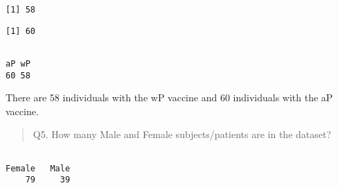 \documentclass[
  letterpaper,
  DIV=11,
  numbers=noendperiod]{scrartcl}
\newenvironment{Shaded}{\begin{snugshade}}{\end{snugshade}}
\newcommand{\FunctionTok}[1]{\textcolor[rgb]{0.28,0.35,0.67}{#1}}
\newcommand{\NormalTok}[1]{\textcolor[rgb]{0.00,0.23,0.31}{#1}}
\newcommand{\SpecialCharTok}[1]{\textcolor[rgb]{0.37,0.37,0.37}{#1}}
\newcommand{\StringTok}[1]{\textcolor[rgb]{0.13,0.47,0.30}{#1}}
\begin{document}
\begin{Shaded}
\end{Shaded}

\begin{verbatim}
[1] 58
\end{verbatim}

\begin{Shaded}
\end{Shaded}

\begin{verbatim}
[1] 60
\end{verbatim}

\begin{Shaded}
\end{Shaded}

\begin{verbatim}

aP wP 
60 58 
\end{verbatim}

There are 58 individuals with the wP vaccine and 60 individuals with the
aP vaccine.

\begin{quote}
Q5. How many Male and Female subjects/patients are in the dataset?
\end{quote}

\begin{Shaded}
\end{Shaded}

\begin{verbatim}

Female   Male 
    79     39 
\end{verbatim}
\end{document}
